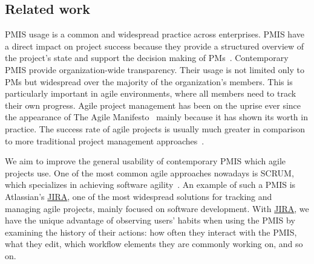 \documentclass[a4paper, 12pt]{article}
\begin{document}


\subsection{Related work}


PMIS usage is a common and widespread practice across enterprises.  PMIS have a direct impact on project success because they provide a structured overview of the project’s state and support the decision making of PMs~\cite{RAYMOND2008213}. Contemporary PMIS provide organization-wide transparency. Their usage is not limited only to PMs but widespread over the majority of the organization’s members. This is particularly important in agile environments, where all members need to track their own progress. Agile project management has been on the uprise ever since the appearance of The Agile Manifesto~\cite{alliance2001agile} mainly because it has shown its worth in practice. The success rate of agile projects is usually much greater in comparison to more traditional project management approaches~\cite{SERRADOR20151040}.

We aim to improve the general usability of contemporary PMIS which agile projects use. One of the most common agile approaches nowadays is SCRUM, which specializes in achieving software agility~\cite{sutherland2013scrum}. An example of such a PMIS is Atlassian’s \href{https://www.atlassian.com/software/jira}{JIRA}, one of the most widespread solutions for tracking and managing agile projects, mainly focused on software development. With \href{https://www.atlassian.com/software/jira}{JIRA}, we have the unique advantage of observing users’ habits when using the PMIS by examining the history of their actions: how often they interact with the PMIS, what they edit, which workflow elements they are commonly working on, and so on. 
\end{document}
